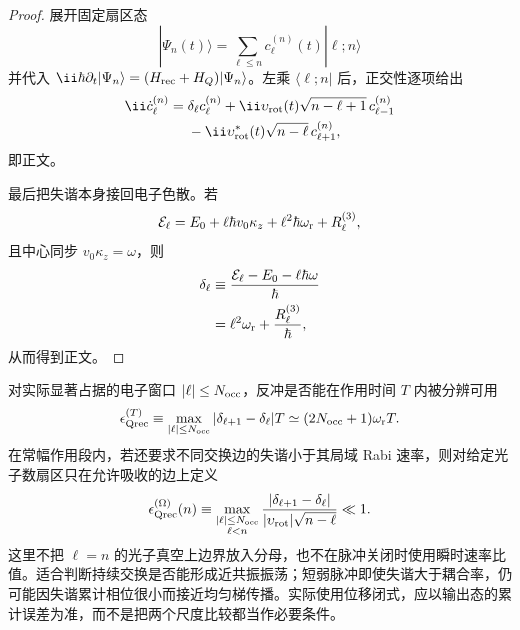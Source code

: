 \begin{proof}
展开固定扇区态
\begin{equation*}
|\Psi_n(t)\rangle
=\sum_{\ell\le n}c_\ell^{(n)}(t)|\ell;n\rangle
\end{equation*}
并代入
\(\ii\hbar\partial_t|\Psi_n\rangle=(H_{\rm rec}+H_Q)|\Psi_n\rangle\)。左乘 \(\langle\ell;n|\) 后，正交性逐项给出
\begin{align*}
\ii\dot c_\ell^{(n)}
={}&\delta_\ell c_\ell^{(n)}
+\ii\upsilon_{\rm rot}(t)\sqrt{n-\ell+1}\,c_{\ell-1}^{(n)}\\
&-\ii\upsilon_{\rm rot}^*(t)\sqrt{n-\ell}\,c_{\ell+1}^{(n)},
\end{align*}
即正文。

最后把失谐本身接回电子色散。若
\begin{equation*}
\mathcal E_\ell
=E_0+\ell\hbar v_0\kappa_z
+\ell^2\hbar\omega_{\rm r}+R_\ell^{(3)},
\end{equation*}
且中心同步 \(v_0\kappa_z=\omega\)，则
\begin{align*}
\delta_\ell
&\equiv\frac{\mathcal E_\ell-E_0-\ell\hbar\omega}{\hbar}\\
&=\ell^2\omega_{\rm r}+\frac{R_\ell^{(3)}}{\hbar},
\end{align*}
从而得到正文。
\end{proof}


对实际显著占据的电子窗口 $|\ell|\le N_{\rm occ}$，反冲是否能在作用时间 $T$ 内被分辨可用
\begin{equation}
{
 \epsilon_{\rm Qrec}^{(T)}
 \equiv\max_{|\ell|\le N_{\rm occ}}
 |\delta_{\ell+1}-\delta_\ell|T
 \simeq(2N_{\rm occ}+1)\omega_{\rm r}T.}
\label{eq:qpinem_recoil_time_control_dp46}
\end{equation}
在常幅作用段内，若还要求不同交换边的失谐小于其局域 Rabi 速率，则对给定光子数扇区只在允许吸收的边上定义
\begin{equation}
{
 \epsilon_{\rm Qrec}^{(\Omega)}(n)
 \equiv
 \max_{\substack{|\ell|\le N_{\rm occ}\\\ell<n}}
 \frac{|\delta_{\ell+1}-\delta_\ell|}
 {|\upsilon_{\rm rot}|\sqrt{n-\ell}}
 \ll1.}
\label{eq:qpinem_recoil_rabi_control_dp46}
\end{equation}
这里不把 $\ell=n$ 的光子真空上边界放入分母，也不在脉冲关闭时使用瞬时速率比值。适合判断持续交换是否能形成近共振振荡；短弱脉冲即使失谐大于耦合率，仍可能因失谐累计相位很小而接近均匀梯传播。实际使用位移闭式，应以输出态的累计误差为准，而不是把两个尺度比较都当作必要条件。

